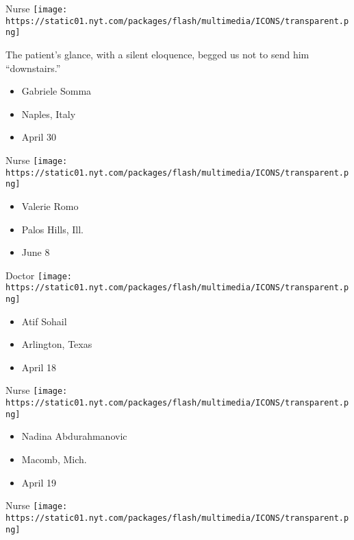 \protect\hyperlink{item-gabriele-somma}{}

Nurse
\texttt{[image: https://static01.nyt.com/packages/flash/multimedia/ICONS/transparent.png]}

The patient's glance, with a silent eloquence, begged us not to send him
``downstairs.''

\begin{itemize}
\tightlist
\item
  Gabriele Somma
\item
  Naples, Italy
\item
  April 30
\end{itemize}

\protect\hyperlink{item-valerie-romo}{}

Nurse
\texttt{[image: https://static01.nyt.com/packages/flash/multimedia/ICONS/transparent.png]}

\begin{itemize}
\tightlist
\item
  Valerie Romo
\item
  Palos Hills, Ill.
\item
  June 8
\end{itemize}

\protect\hyperlink{item-atif-sohail}{}

Doctor
\texttt{[image: https://static01.nyt.com/packages/flash/multimedia/ICONS/transparent.png]}

\begin{itemize}
\tightlist
\item
  Atif Sohail
\item
  Arlington, Texas
\item
  April 18
\end{itemize}

\protect\hyperlink{item-nadina-abdurahmanovic}{}

Nurse
\texttt{[image: https://static01.nyt.com/packages/flash/multimedia/ICONS/transparent.png]}

\begin{itemize}
\tightlist
\item
  Nadina Abdurahmanovic
\item
  Macomb, Mich.
\item
  April 19
\end{itemize}

\protect\hyperlink{item-rohan-singh}{}

Nurse
\texttt{[image: https://static01.nyt.com/packages/flash/multimedia/ICONS/transparent.png]}

